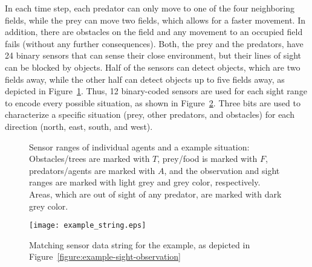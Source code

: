 In each time step, each predator can only move to one of the four neighboring fields, while the prey can move two fields, which allows for a faster movement. In addition, there are obstacles on the field and any movement to an occupied field fails (without any further consequences). Both, the prey and the predators, have 24 binary sensors that can sense their close environment, but their lines of sight can be blocked by objects. Half of the sensors can detect objects, which are two fields away, while the other half can detect objects up to five fields away, as depicted in Figure~\ref{figure:sight-directions}. %
Thus, 12 binary-coded sensors are used for each sight range to encode every possible situation, as shown in Figure~\ref{figure:example-string}. Three bits are used to characterize a specific situation (prey, other predators, and obstacles) for each direction (north, east, south, and west). 

\begin{figure}[ht]
	\hfill
  \hfill
  \subfigure[Example situation]{ %
  	\label{figure:example-sight-observation}
  	\texttt{[image: example\_sight\_observation.eps]}
  }
  \caption{Sensor ranges of individual agents and a example situation: Obstacles/trees are marked with $T$, prey/food is marked with $F$, predators/agents are marked with $A$, and the observation and sight ranges are marked with light grey and grey color, respectively. Areas, which are out of sight of any predator, are marked with dark grey color.}
  \label{figure:sight-directions}
\end{figure}

\begin{figure}[ht]
	\centerline{
		\texttt{[image: example\_string.eps]}
	}
	\caption{Matching sensor data string for the example, as depicted in Figure~\ref{figure:example-sight-observation}}
	\label{figure:example-string}
\end{figure}


